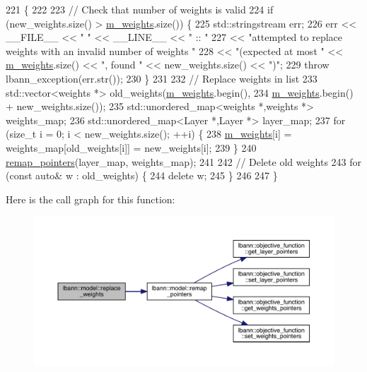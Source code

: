 \begin{DoxyCode}
221                                                             \{
222 
223   \textcolor{comment}{// Check that number of weights is valid}
224   \textcolor{keywordflow}{if} (new\_weights.size() > \hyperlink{classlbann_1_1model_aaf9adefe4497d90bf5bc2567e71bfb00}{m\_weights}.size()) \{
225     std::stringstream err;
226     err << \_\_FILE\_\_ << \textcolor{stringliteral}{" "} << \_\_LINE\_\_ << \textcolor{stringliteral}{" :: "}
227         << \textcolor{stringliteral}{"attempted to replace weights with an invalid number of weights "}
228         << \textcolor{stringliteral}{"(expected at most "} << \hyperlink{classlbann_1_1model_aaf9adefe4497d90bf5bc2567e71bfb00}{m\_weights}.size() << \textcolor{stringliteral}{", found "} << new\_weights.size() << \textcolor{stringliteral}{")"};
229     \textcolor{keywordflow}{throw} lbann\_exception(err.str());
230   \}
231 
232   \textcolor{comment}{// Replace weights in list}
233   std::vector<weights *> old\_weights(\hyperlink{classlbann_1_1model_aaf9adefe4497d90bf5bc2567e71bfb00}{m\_weights}.begin(),
234                                      \hyperlink{classlbann_1_1model_aaf9adefe4497d90bf5bc2567e71bfb00}{m\_weights}.begin() + new\_weights.size());
235   std::unordered\_map<weights *,weights *> weights\_map;
236   std::unordered\_map<Layer *,Layer *> layer\_map;
237   \textcolor{keywordflow}{for} (\textcolor{keywordtype}{size\_t} i = 0; i < new\_weights.size(); ++i) \{
238     \hyperlink{classlbann_1_1model_aaf9adefe4497d90bf5bc2567e71bfb00}{m\_weights}[i] = weights\_map[old\_weights[i]] = new\_weights[i];
239   \}
240   \hyperlink{classlbann_1_1model_ac6cc0f5d850cfb997bbbc70eefa0d68f}{remap\_pointers}(layer\_map, weights\_map);
241 
242   \textcolor{comment}{// Delete old weights}
243   \textcolor{keywordflow}{for} (\textcolor{keyword}{const} \textcolor{keyword}{auto}& w : old\_weights) \{
244     \textcolor{keyword}{delete} w;
245   \}
246 
247 \}
\end{DoxyCode}
Here is the call graph for this function\+:\nopagebreak
\begin{figure}[H]
\begin{center}
\leavevmode
\includegraphics[width=350pt]{classlbann_1_1model_aaed20219476dc1458bbd058be36de1ec_cgraph}
\end{center}
\end{figure}
